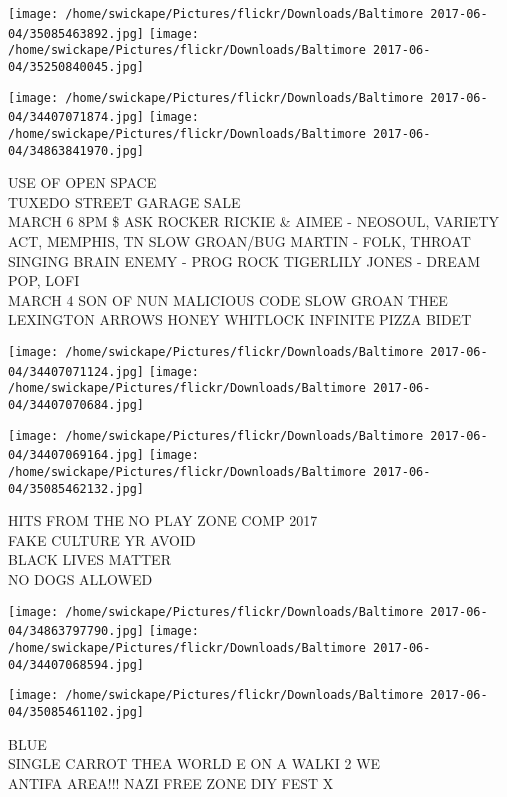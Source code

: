\documentclass[10pt,letterpaper]{article}
\begin{document}
\texttt{[image: /home/swickape/Pictures/flickr/Downloads/Baltimore 2017-06-04/35085463892.jpg]}
\texttt{[image: /home/swickape/Pictures/flickr/Downloads/Baltimore 2017-06-04/35250840045.jpg]}

\texttt{[image: /home/swickape/Pictures/flickr/Downloads/Baltimore 2017-06-04/34407071874.jpg]}
\texttt{[image: /home/swickape/Pictures/flickr/Downloads/Baltimore 2017-06-04/34863841970.jpg]}

USE OF OPEN SPACE\\
TUXEDO STREET GARAGE SALE\\
MARCH 6 8PM \$ ASK ROCKER RICKIE \& AIMEE {-} NEOSOUL, VARIETY ACT, MEMPHIS, TN SLOW GROAN/BUG MARTIN {-} FOLK, THROAT SINGING BRAIN ENEMY {-} PROG ROCK TIGERLILY JONES {-} DREAM POP, LOFI\\
MARCH 4 SON OF NUN MALICIOUS CODE SLOW GROAN THEE LEXINGTON ARROWS HONEY WHITLOCK INFINITE PIZZA BIDET\\
\pagebreak

\texttt{[image: /home/swickape/Pictures/flickr/Downloads/Baltimore 2017-06-04/34407071124.jpg]}
\texttt{[image: /home/swickape/Pictures/flickr/Downloads/Baltimore 2017-06-04/34407070684.jpg]}

\texttt{[image: /home/swickape/Pictures/flickr/Downloads/Baltimore 2017-06-04/34407069164.jpg]}
\texttt{[image: /home/swickape/Pictures/flickr/Downloads/Baltimore 2017-06-04/35085462132.jpg]}

HITS FROM THE NO PLAY ZONE COMP 2017\\
FAKE CULTURE YR AVOID\\
BLACK LIVES MATTER\\
NO DOGS ALLOWED\\
\pagebreak

\texttt{[image: /home/swickape/Pictures/flickr/Downloads/Baltimore 2017-06-04/34863797790.jpg]}
\texttt{[image: /home/swickape/Pictures/flickr/Downloads/Baltimore 2017-06-04/34407068594.jpg]}

\texttt{[image: /home/swickape/Pictures/flickr/Downloads/Baltimore 2017-06-04/35085461102.jpg]}

BLUE\\
SINGLE CARROT THEA WORLD E ON A WALKI 2 WE\\
ANTIFA AREA!!! NAZI FREE ZONE DIY FEST X\\
\pagebreak
\end{document}
